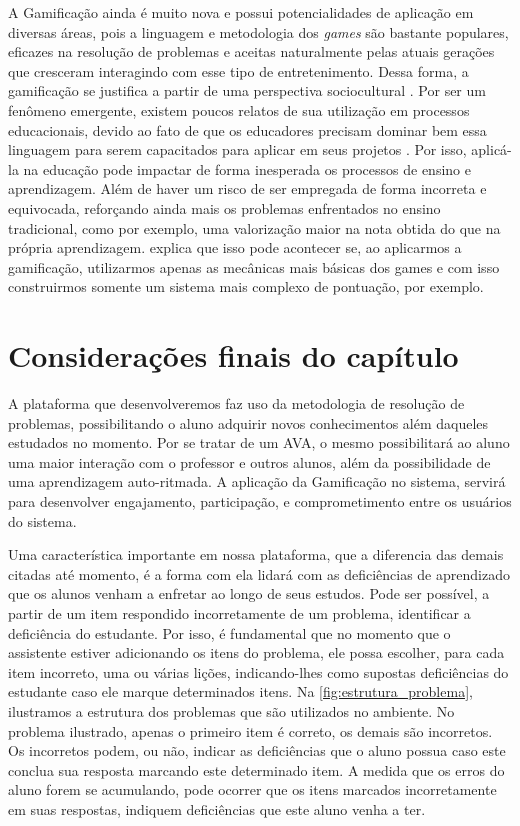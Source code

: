 A Gamificação ainda \'e muito nova e possui potencialidades de aplica\c{c}\~ao em diversas áreas, pois a linguagem e metodologia dos 
\textit{games} s\~ao bastante populares, eficazes na resolução de problemas e aceitas naturalmente pelas atuais gera\c{c}\~oes que 
cresceram interagindo com esse tipo de entretenimento. Dessa forma, a gamificação se justifica a partir de uma perspectiva sociocultural 
\cite{fardo2013gamificaccao}. Por ser um fen\^omeno emergente, existem poucos relatos de sua utiliza\c{c}\~ao em processos educacionais, 
devido ao fato de que os educadores precisam dominar bem essa linguagem para serem capacitados para aplicar em seus projetos 
\cite{fardo2013gamificaccao}. Por isso, aplic\'a-la na educa\c{c}\~ao pode impactar de forma inesperada os processos de ensino e 
aprendizagem. Al\'em de haver um risco de ser empregada de forma incorreta e equivocada, refor\c{c}ando ainda mais os problemas enfrentados 
no ensino tradicional, como por exemplo, uma valoriza\c{c}\~ao maior na nota obtida do que na pr\'opria 
aprendizagem.  explica que isso pode acontecer se, ao aplicarmos a gamifica\c{c}\~ao, utilizarmos
apenas as mecânicas mais básicas dos games e com isso construirmos somente um sistema mais complexo de pontuação, por exemplo.   



\section{Considerações finais do cap\'itulo}

A plataforma que desenvolveremos faz uso da metodologia de resolução de problemas, possibilitando o aluno adquirir novos conhecimentos além daqueles estudados no momento. Por se tratar de um AVA, 
o mesmo possibilitará ao aluno uma maior interação com o professor e outros alunos, além da possibilidade de uma aprendizagem auto-ritmada. A aplicação da Gamificação no sistema, servir\'a para desenvolver  engajamento, participação, e comprometimento entre os usuários do sistema. 

Uma característica importante em nossa plataforma, que a diferencia das demais citadas até momento, é a forma com ela lidará com as deficiências de aprendizado que os alunos venham a enfretar ao longo de seus estudos. Pode ser possível, a partir de um item respondido incorretamente de um problema, identificar a deficiência do estudante. Por isso, é fundamental que no momento que o assistente estiver adicionando os itens do problema, ele possa escolher, para cada item incorreto, uma ou várias li\c{c}\~oes, indicando-lhes como supostas defici\^encias do estudante caso ele marque determinados itens. Na \autoref{fig:estrutura_problema}, ilustramos a estrutura dos problemas que são utilizados no ambiente. No problema ilustrado, apenas o primeiro item é correto, os demais são incorretos. Os incorretos podem, ou não, indicar as deficiências que o aluno possua caso este conclua sua resposta marcando este determinado item. A medida que os erros do aluno forem se acumulando, pode ocorrer que os itens marcados incorretamente em suas respostas, indiquem deficiências que este aluno venha a ter.


